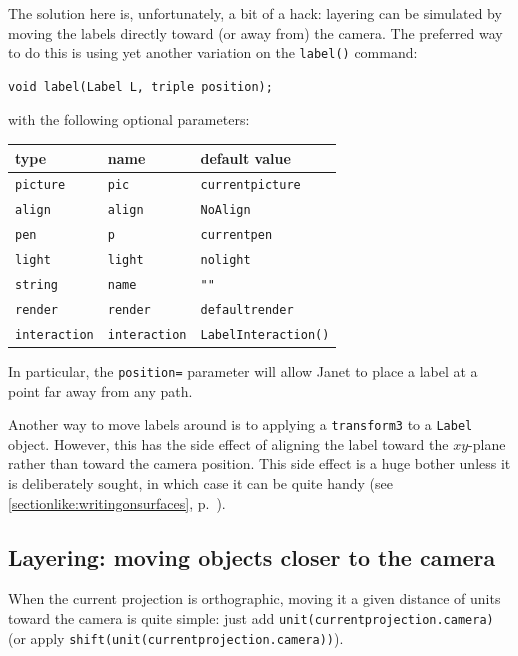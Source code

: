 \documentclass{article}
\begin{document}
The solution here is, unfortunately, a bit of a hack: layering can be simulated by
moving the labels directly toward (or away from) the camera.
The preferred way to do this is using yet another variation on the
\texttt{label()} command:
\begin{lstlisting}
void label(Label L, triple position);
\end{lstlisting}
with the following optional parameters:
\begin{center}
\begin{tabular}{@{}l l l@{}}  \toprule
type & name & default value \\ \midrule
\texttt{picture} & \texttt{pic} & \texttt{currentpicture} \\
\texttt{align} & \texttt{align} & \texttt{NoAlign} \\
\texttt{pen} & \texttt{p} & \texttt{currentpen} \\
\texttt{light} & \texttt{light} & \texttt{nolight} \\
\texttt{string} & \texttt{name} & \texttt{""} \\
\texttt{render} & \texttt{render} & \texttt{defaultrender} \\
\texttt{interaction} & \texttt{interaction} & \texttt{LabelInteraction()} \\
\bottomrule
\end{tabular}
\end{center}
In particular, the \texttt{position=} parameter will allow Janet to place a label
at a point far away from any path.

\medskip
\begin{warning}
Another way to move labels around is to applying a \texttt{transform3}
to a \texttt{Label} object. However, this has the side effect of aligning
the label toward the $xy$-plane rather than toward the camera position. This side effect
is a huge bother unless it is deliberately sought, in which
case it can be quite handy
(see \ref{sectionlike:writingonsurfaces}, 
p.~\pageref{sectionlike:writingonsurfaces}).
\end{warning}

\subsection{Layering: moving objects closer to the camera}
%
When the current projection is orthographic, moving it a given distance of units
toward the camera is quite simple: just add \texttt{unit(currentprojection.camera)}
(or apply \texttt{shift(unit(currentprojection.camera))}).
\end{document}
